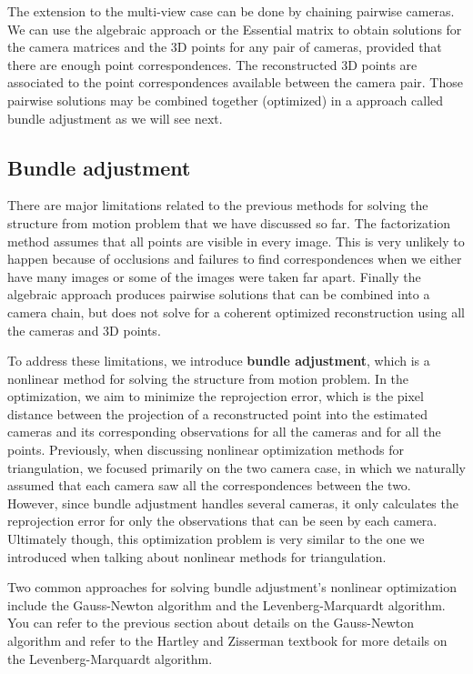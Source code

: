 \documentclass[a4paper, 12pt]{article}
\renewcommand\emph{\textbf}
\numberwithin{equation}{section}
\begin{document}
The extension to the multi-view case can be done by chaining pairwise cameras. We can use the algebraic approach or the Essential matrix to obtain solutions for the camera matrices and the 3D points for any pair of cameras, provided that there are enough point correspondences. The reconstructed 3D points are associated to the point correspondences available between the camera pair. Those pairwise solutions may be combined together (optimized) in a approach called bundle adjustment as we will see next.

\subsection{Bundle adjustment}
There are major limitations related to the previous methods for solving the structure from motion problem that we have discussed so far. The factorization method assumes that all points are visible in every image. This is very unlikely to happen because of occlusions and failures to find correspondences when we either have many images or some of the images were taken far apart. Finally the algebraic approach produces pairwise solutions that can be combined into a camera chain, but does not solve for a coherent optimized reconstruction using all the cameras and 3D points.

To address these limitations, we introduce \emph{bundle adjustment}, which is a nonlinear method for solving the structure from motion problem. In the optimization, we aim to minimize the reprojection error, which is the pixel distance between the projection of a reconstructed point into the estimated cameras and its corresponding observations for all the cameras and for all the points. Previously, when discussing nonlinear optimization methods for triangulation, we focused primarily on the two camera case, in which we naturally assumed that each camera saw all the correspondences between the two. However, since bundle adjustment handles several cameras, it only calculates the reprojection error for only the observations that can be seen by each camera. Ultimately though, this optimization problem is very similar to the one we introduced when talking about nonlinear methods for triangulation. 

Two common approaches for solving bundle adjustment's nonlinear optimization include the Gauss-Newton algorithm and the Levenberg-Marquardt algorithm. You can refer to the previous section about details on the Gauss-Newton algorithm and refer to the Hartley and Zisserman textbook for more details on the Levenberg-Marquardt algorithm.
\end{document}
